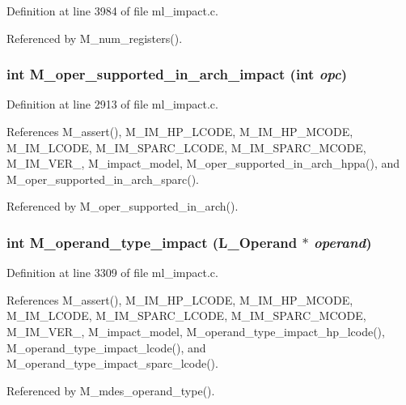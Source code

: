 Definition at line 3984 of file ml\_\-impact.c.

Referenced by M\_\-num\_\-registers().
\subsubsection{\setlength{\rightskip}{0pt plus 5cm}int M\_\-oper\_\-supported\_\-in\_\-arch\_\-impact (int {\em opc})}\label{ml__impact_8c_dc11d8be06a626bed81c4561060ec8fa}




Definition at line 2913 of file ml\_\-impact.c.

References M\_\-assert(), M\_\-IM\_\-HP\_\-LCODE, M\_\-IM\_\-HP\_\-MCODE, M\_\-IM\_\-LCODE, M\_\-IM\_\-SPARC\_\-LCODE, M\_\-IM\_\-SPARC\_\-MCODE, M\_\-IM\_\-VER\_, M\_\-impact\_\-model, M\_\-oper\_\-supported\_\-in\_\-arch\_\-hppa(), and M\_\-oper\_\-supported\_\-in\_\-arch\_\-sparc().

Referenced by M\_\-oper\_\-supported\_\-in\_\-arch().
\subsubsection{\setlength{\rightskip}{0pt plus 5cm}int M\_\-operand\_\-type\_\-impact (L\_\-Operand $\ast$ {\em operand})}\label{ml__impact_8c_992eb8e949512feb4f789e105b6bc110}




Definition at line 3309 of file ml\_\-impact.c.

References M\_\-assert(), M\_\-IM\_\-HP\_\-LCODE, M\_\-IM\_\-HP\_\-MCODE, M\_\-IM\_\-LCODE, M\_\-IM\_\-SPARC\_\-LCODE, M\_\-IM\_\-SPARC\_\-MCODE, M\_\-IM\_\-VER\_, M\_\-impact\_\-model, M\_\-operand\_\-type\_\-impact\_\-hp\_\-lcode(), M\_\-operand\_\-type\_\-impact\_\-lcode(), and M\_\-operand\_\-type\_\-impact\_\-sparc\_\-lcode().

Referenced by M\_\-mdes\_\-operand\_\-type().
